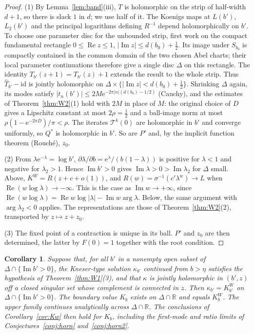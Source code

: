 \documentclass[11pt,a4paper]{article}
\newtheorem{corollary}[theorem]{Corollary}
\theoremstyle{definition}
\newcommand{\Rr}{R}
\newcommand{\Kk}{K}
\newcommand{\eee}{\mathrm{e}}
\begin{document}
\begin{proof}
(1) By Lemma~\ref{lem:band}(iii), $T$ is holomorphic on the strip of half-width $d+1$,
so there is slack $1$ in $d$; we use half of it.  The Koenigs maps at $L(b')$, $L_2(b')$ and the principal logarithms
defining $\Rr^{-1}$ depend holomorphically on $b'$.  To choose one
parameter disc for the unbounded strip, first work on the compact fundamental
rectangle $0\le\operatorname{Re}z\le1$,
$|\operatorname{Im}z|\le d(b_0)+\tfrac12$.  Its image under $S_{b_0}$
is compactly contained in the common domain of the two chosen Abel charts;
their local parameter continuations therefore give a single disc $\Delta$
on this rectangle.  The identity $T_{b'}(z+1)=T_{b'}(z)+1$ extends the
result to the whole strip.  Thus $\hat T_{b'}-\mathrm{id}$ is jointly
holomorphic on $\Delta\times\{|\operatorname{Im}z|<d(b_0)+\tfrac12\}$.
Shrinking $\Delta$ again,
its modes satisfy $|t_n(b')|\le2M\eee^{-2\pi|n|(d(b_0)-1/2)}$ (Cauchy), and the
estimates of Theorem~\ref{thm:W2}(1) hold with $2M$ in place of $M$:
the original choice of $D$ gives a Lipschitz constant at most
$2\rho=\tfrac12$ and a ball-image norm at most
$\rho(1-\eee^{-2\pi D})/\pi<\rho$.  The iterates $\mathcal T^k(0)$ are holomorphic in $b'$
and converge uniformly, so $Q^*$ is holomorphic in $b'$.  So are $P'$ and,
by the implicit function theorem (Rouch\'e), $z_0$.

(2) From $\lambda\eee^{-\lambda}=\log b'$,
$\partial\lambda/\partial b=\eee^{\lambda}/(b(1-\lambda))$ is positive for
$\lambda<1$ and negative for $\lambda_2>1$.  Hence $\operatorname{Im}b'>0$
gives $\operatorname{Im}\lambda>0>\operatorname{Im}\lambda_2$ for $\Delta$
small.  Above, $\Kk^W=\Rr(z+c+o(1))$, and
$\Rr(w)=\sigma^{-1}(c'\lambda^w)\to L$ when
$\operatorname{Re}(w\log\lambda)\to-\infty$.  This is the case as
$\operatorname{Im}w\to+\infty$, since
$\operatorname{Re}(w\log\lambda)=\operatorname{Re}w\log|\lambda|-\operatorname{Im}w\arg\lambda$.
Below, the same argument with $\arg\lambda_2<0$ applies.  The representations
are those of Theorem~\ref{thm:W2}(2), transported by $z\mapsto z+z_0$.

(3) The fixed point of a contraction is unique in its ball.  $P'$ and $z_0$
are then determined, the latter by $F(0)=1$ together with the root
condition.
\end{proof}

\begin{corollary}\label{cor:W1}
Suppose that, for all $b'$ in a nonempty open subset of
$\Delta\cap\{\operatorname{Im}b'>0\}$, the Kneser-type solution $\kappa_{b'}$
continued from $b>\eta$ satisfies the hypothesis of Theorem~\ref{thm:W1}(3), and
that $\kappa$ is jointly holomorphic in $(b',z)$ off a closed singular set whose
complement is connected in $z$.  Then $\kappa_{b'}=\Kk^W_{b'}$ on
$\Delta\cap\{\operatorname{Im}b'>0\}$.  The boundary value $\Kk_b$ exists on
$\Delta\cap\mathbb R$ and equals $\Kk^W_b$.  The upper family continues
analytically across $\Delta\cap\mathbb R$.  The conclusions of
Corollary~\ref{cor:Kw} then hold for $\Kk_b$, including the first-mode
and ratio limits of Conjectures~\ref{conj:horn} and~\ref{conj:horn2}.
\end{corollary}
\end{document}
